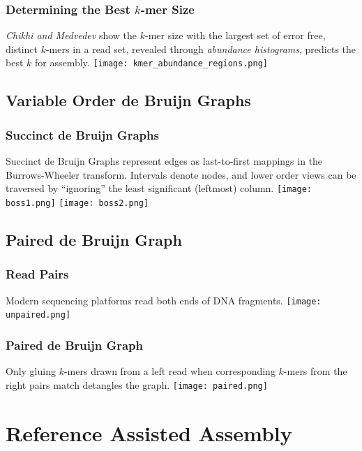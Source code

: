 \documentclass{beamer}
\begin{document}
\begin{frame}
\frametitle{Determining the Best $k$-mer Size}
\emph{Chikhi and Medvedev} show the $k$-mer size with the largest set of error free, distinct $k$-mers in a read set, revealed through \emph{abundance histograms}, predicts the best $k$ for assembly. 
\texttt{[image: kmer\_abundance\_regions.png]}

\end{frame}

\subsection{Variable Order de Bruijn Graphs}

\begin{frame}
\frametitle{Succinct de Bruijn Graphs}
Succinct de Bruijn Graphs represent edges as last-to-first mappings in the Burrows-Wheeler transform. Intervals denote nodes, and lower order views can be traversed by ``ignoring'' the least significant (leftmost) column.
\texttt{[image: boss1.png]}
\texttt{[image: boss2.png]}

% 
\end{frame}

\subsection{Paired de Bruijn Graph}
\begin{frame}
\frametitle{Read Pairs}
Modern sequencing platforms read both ends of DNA fragments.
\texttt{[image: unpaired.png]}

% 
\end{frame}


\begin{frame}
\frametitle{Paired de Bruijn Graph}
Only gluing $k$-mers drawn from a left read when corresponding $k$-mers from the right pairs match detangles the graph.
\texttt{[image: paired.png]}

% 
\end{frame}

\section{Reference Assisted Assembly}
\end{document}
